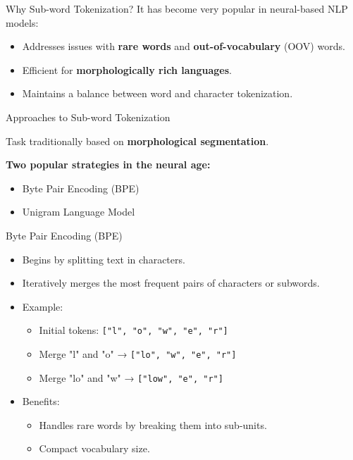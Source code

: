 \documentclass{beamer}
\begin{document}
\begin{frame}{Why Sub-word Tokenization?}
    It has become very popular in neural-based NLP models:
    \begin{itemize}
        \item Addresses issues with \textbf{rare words} and \textbf{out-of-vocabulary} (OOV) words.
        \item Efficient for \textbf{morphologically rich languages}.
        \item Maintains a balance between word and character tokenization.
    \end{itemize}
\end{frame}

\begin{frame}{Approaches to Sub-word Tokenization}

    Task traditionally based on \textbf{morphological segmentation}.

    \vspace{1cm}

    \textbf{Two popular strategies in the neural age:}
    \begin{itemize}
        \item Byte Pair Encoding (BPE)
        \item Unigram Language Model
    \end{itemize}
\end{frame}

\begin{frame}{Byte Pair Encoding (BPE)}
    \begin{itemize}
        \item Begins by splitting text in characters.
        \item Iteratively merges the most frequent pairs of characters or subwords.
        \item Example:
        \begin{itemize}
            \item Initial tokens: \texttt{["l", "o", "w", "e", "r"]}
            \item Merge "l" and "o" → \texttt{["lo", "w", "e", "r"]}
            \item Merge "lo" and "w" → \texttt{["low", "e", "r"]}
        \end{itemize}
        \item Benefits:
        \begin{itemize}
            \item Handles rare words by breaking them into sub-units.
            \item Compact vocabulary size.
        \end{itemize}
    \end{itemize}
\end{frame}
\end{document}
